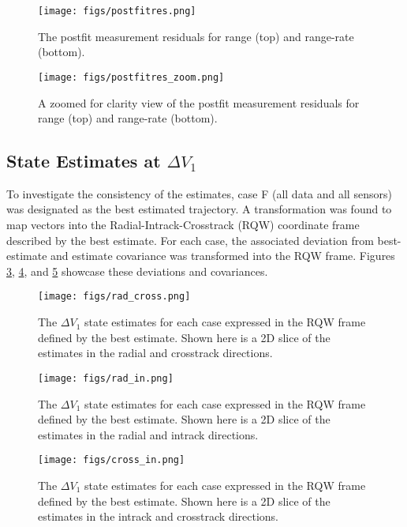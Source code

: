\documentclass[11pt]{article}
\begin{document}
\begin{figure}[!htb]
	\centering
	\texttt{[image: figs/postfitres.png]}
	\caption{The postfit measurement residuals for range (top) and range-rate (bottom).}
	\label{fig:postfit}
\end{figure}

\begin{figure}[!htb]
	\centering
	\texttt{[image: figs/postfitres\_zoom.png]}
	\caption{A zoomed for clarity view of the postfit measurement residuals for range (top) and range-rate (bottom).}
	\label{fig:postfit_zoom}
\end{figure}

\subsection{State Estimates at $\Delta V_1$}

To investigate the consistency of the estimates, case F (all data and all sensors) was designated as the best estimated trajectory. A transformation was found to map vectors into the Radial-Intrack-Crosstrack (RQW) coordinate frame described by the best estimate. For each case, the associated deviation from best-estimate and estimate covariance was transformed into the RQW frame. Figures \ref{fig:rad_cross}, \ref{fig:rad_in}, and \ref{fig:cross_in} showcase these deviations and covariances.

\begin{figure}[!htb]
	\centering
	\texttt{[image: figs/rad\_cross.png]}
	\caption{The $\Delta V_1$ state estimates for each case expressed in the RQW frame defined by the best estimate. Shown here is a 2D slice of the estimates in the radial and crosstrack directions.}
	\label{fig:rad_cross}
\end{figure}

\begin{figure}[!htb]
	\centering
	\texttt{[image: figs/rad\_in.png]}
	\caption{The $\Delta V_1$ state estimates for each case expressed in the RQW frame defined by the best estimate. Shown here is a 2D slice of the estimates in the radial and intrack directions.}
	\label{fig:rad_in}
\end{figure}

\begin{figure}[!htb]
	\centering
	\texttt{[image: figs/cross\_in.png]}
	\caption{The $\Delta V_1$ state estimates for each case expressed in the RQW frame defined by the best estimate. Shown here is a 2D slice of the estimates in the intrack and crosstrack directions.}
	\label{fig:cross_in}
\end{figure}
\end{document}
